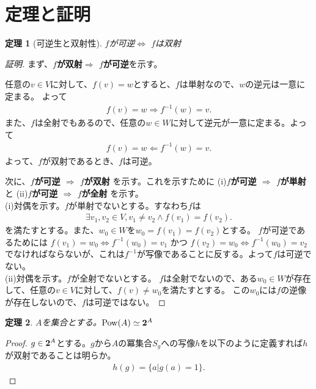 \documentclass{jsarticle}
\newtheorem{Theorem}{定理}
\newcommand{\Pow}{ {\rm Pow} }
\newcommand{\2}{ {\bf 2} }
\begin{document}
\section{定理と証明}
\begin{Theorem}[可逆生と双射性]
    $f$が可逆$\Leftrightarrow$ $f$は双射
\end{Theorem}
\begin{proof}[証明]
    まず、{\bf $f$が双射$\Rightarrow$ $f$が可逆}を示す。
    
    任意の$v\in V$に対して、$f(v)=w$とすると、$f$は単射なので、$w$の逆元は一意に定まる。
    よって
    \begin{align*}
        f(v)=w \Rightarrow f^{-1}(w)=v.
    \end{align*}
    また、$f$は全射でもあるので、任意の$w \in W$に対して逆元が一意に定まる。よって
    \begin{align*}
        f(v)=w \Leftarrow f^{-1}(w)=v.
    \end{align*}
    よって、$f$が双射であるとき、$f$は可逆。

    次に、{\bf $f$が可逆 $\Rightarrow$ $f$が双射}
    を示す。これを示すために
    (i){\bf $f$が可逆 $\Rightarrow$ $f$が単射}
    と
    (ii){\bf $f$が可逆 $\Rightarrow$ $f$が全射}
    を示す。\\
    (i)対偶を示す。$f$が単射でないとする。すなわち$f$は
    \begin{align*}
        \exists v_1, v_2 \in V, v_1 \neq v_2 \land f(v_1)=f(v_2).
    \end{align*}
    を満たすとする。また、$w_0 \in W$を$w_0 = f(v_1)=f(v_2)$とする。
    $f$が可逆であるためには
    $f(v_1)=w_0 \Leftrightarrow f^{-1}(w_0)=v_1$ かつ $f(v_2)=w_0 \Leftrightarrow f^{-1}(w_0)=v_2$
    でなければならないが、これは$f^{-1}$が写像であることに反する。よって$f$は可逆でない。\\
    (ii)対偶を示す。$f$が全射でないとする。
    $f$は全射でないので、ある$w_0 \in W$が存在して、任意の$v \in V$に対して、$f(v) \neq w_0$を満たすとする。
    この$w_0$には$f$の逆像が存在しないので、$f$は可逆ではない。
\end{proof}

\begin{Theorem}
    $A$を集合とする。$\Pow(A) \simeq {\2}^A$
\end{Theorem}
\begin{proof}
    $g \in {\2}^A$とする。$g$から$A$の冪集合$S_g$への写像$h$を以下のように定義すれば$h$が双射であることは明らか。
    \begin{align*}
        h(g) = \{ a | g(a)=1 \}.
    \end{align*}
\end{proof}
\end{document}
